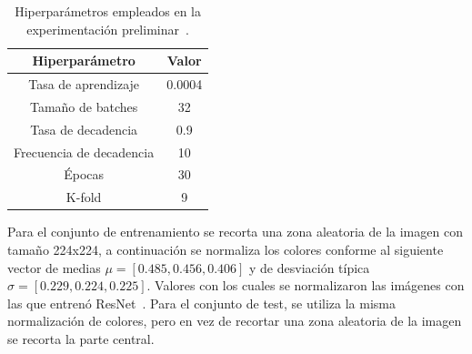 \begin{table}[htp]
  \scriptsize
  \begin{center}
    \begin{tabular}[c]{|c|c|}
      \hline
      \rowcolor[HTML]{FFC702}
      \textbf{Hiperparámetro} & \textbf{Valor} \\ 
      \hline 
      Tasa de aprendizaje &  0.0004 \\ 
      \hline 
      Tamaño de batches & 32 \\ 
      \hline 
      Tasa de decadencia & 0.9 \\ 
      \hline 
      Frecuencia de decadencia & 10 \\ 
      \hline 
      Épocas & 30 \\ 
      \hline 
      K-fold & 9 \\ 
      \hline 
    \end{tabular}
  \end{center}
  \caption[Hiperparámetros empleados en la experimentación preliminar.]{
    Hiperparámetros empleados en la experimentación preliminar~\cite{VQA-PC}.
  }
  \label{tab:HiperSJTU}
\end{table}

Para el conjunto de entrenamiento se recorta una zona aleatoria de la imagen con 
tamaño 224x224, a continuación se normaliza los colores conforme al siguiente 
vector de medias $\mu = \left[ 0.485, 0.456, 0.406 \right]$ y de desviación típica
$\sigma = \left[ 0.229, 0.224, 0.225 \right]$. Valores con los cuales se 
normalizaron las imágenes con las que entrenó ResNet~\cite{ResNet}.
Para el conjunto de test, se utiliza la misma normalización de colores, pero 
en vez de recortar una zona aleatoria de la imagen se recorta la parte central. 

